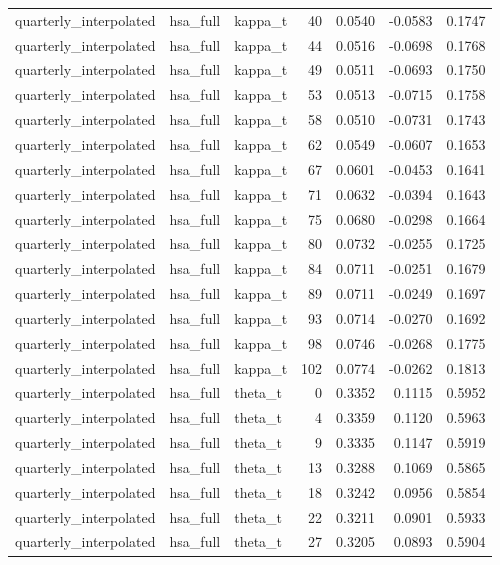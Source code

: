 \begin{tabular}{lllrrrr}
quarterly\_interpolated & hsa\_full & kappa\_t & 40 & 0.0540 & -0.0583 & 0.1747 \\
quarterly\_interpolated & hsa\_full & kappa\_t & 44 & 0.0516 & -0.0698 & 0.1768 \\
quarterly\_interpolated & hsa\_full & kappa\_t & 49 & 0.0511 & -0.0693 & 0.1750 \\
quarterly\_interpolated & hsa\_full & kappa\_t & 53 & 0.0513 & -0.0715 & 0.1758 \\
quarterly\_interpolated & hsa\_full & kappa\_t & 58 & 0.0510 & -0.0731 & 0.1743 \\
quarterly\_interpolated & hsa\_full & kappa\_t & 62 & 0.0549 & -0.0607 & 0.1653 \\
quarterly\_interpolated & hsa\_full & kappa\_t & 67 & 0.0601 & -0.0453 & 0.1641 \\
quarterly\_interpolated & hsa\_full & kappa\_t & 71 & 0.0632 & -0.0394 & 0.1643 \\
quarterly\_interpolated & hsa\_full & kappa\_t & 75 & 0.0680 & -0.0298 & 0.1664 \\
quarterly\_interpolated & hsa\_full & kappa\_t & 80 & 0.0732 & -0.0255 & 0.1725 \\
quarterly\_interpolated & hsa\_full & kappa\_t & 84 & 0.0711 & -0.0251 & 0.1679 \\
quarterly\_interpolated & hsa\_full & kappa\_t & 89 & 0.0711 & -0.0249 & 0.1697 \\
quarterly\_interpolated & hsa\_full & kappa\_t & 93 & 0.0714 & -0.0270 & 0.1692 \\
quarterly\_interpolated & hsa\_full & kappa\_t & 98 & 0.0746 & -0.0268 & 0.1775 \\
quarterly\_interpolated & hsa\_full & kappa\_t & 102 & 0.0774 & -0.0262 & 0.1813 \\
quarterly\_interpolated & hsa\_full & theta\_t & 0 & 0.3352 & 0.1115 & 0.5952 \\
quarterly\_interpolated & hsa\_full & theta\_t & 4 & 0.3359 & 0.1120 & 0.5963 \\
quarterly\_interpolated & hsa\_full & theta\_t & 9 & 0.3335 & 0.1147 & 0.5919 \\
quarterly\_interpolated & hsa\_full & theta\_t & 13 & 0.3288 & 0.1069 & 0.5865 \\
quarterly\_interpolated & hsa\_full & theta\_t & 18 & 0.3242 & 0.0956 & 0.5854 \\
quarterly\_interpolated & hsa\_full & theta\_t & 22 & 0.3211 & 0.0901 & 0.5933 \\
quarterly\_interpolated & hsa\_full & theta\_t & 27 & 0.3205 & 0.0893 & 0.5904 \\

\end{tabular}
